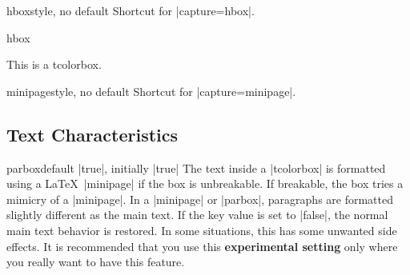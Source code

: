 \begin{docTcbKey}{hbox}{}{style, no default}
  Shortcut for |capture=hbox|.
\begin{exdispExample}{hbox}

\begin{tcolorbox}[hbox]
This is a tcolorbox.
\end{tcolorbox}
\end{exdispExample}
\end{docTcbKey}


\begin{docTcbKey}{minipage}{}{style, no default}
  Shortcut for |capture=minipage|.
\end{docTcbKey}


\clearpage
\subsection{Text Characteristics}
\begin{docTcbKey}[][doc updated=2024-01-10]{parbox}{}{default |true|, initially |true|}
  The text inside a |tcolorbox| is formatted using a \LaTeX\ |minipage|
  if the box is unbreakable. If breakable, the box tries a mimicry of
  a |minipage|. In a |minipage| or |parbox|, paragraphs are formatted slightly different
  as the main text. If the key value is set to |false|, the normal main text
  behavior is restored. In some situations, this has some unwanted side
  effects. It is recommended that you use this \textbf{experimental setting} only
  where you really want to have this feature.
\end{docTcbKey}

\begin{dispListing}

\begin{tcolorbox}[parbox,adjusted title={parbox=true (normal)}]
  \lipsum[1-2]
\end{tcolorbox}\hfill%
\begin{tcolorbox}[parbox=false,adjusted title={parbox=false}]
  \lipsum[1-2]
\end{tcolorbox}%
\end{dispListing}
{\tcbusetemp}


